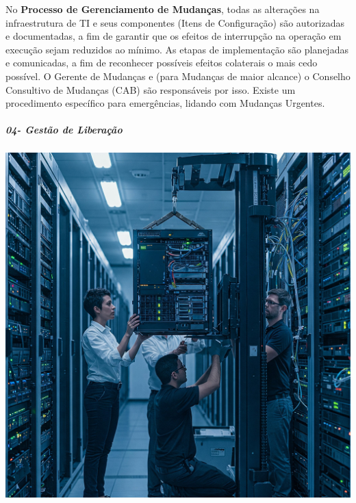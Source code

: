 \documentclass[
]{book}
\begin{document}
No \textbf{Processo de Gerenciamento de Mudanças}, todas as alterações na infraestrutura de TI e seus componentes (Itens de Configuração) são autorizadas e documentadas, a fim de garantir que os efeitos de interrupção na operação em execução sejam reduzidos ao mínimo. As etapas de implementação são planejadas e comunicadas, a fim de reconhecer possíveis efeitos colaterais o mais cedo possível. O Gerente de Mudanças e (para Mudanças de maior alcance) o Conselho Consultivo de Mudanças (CAB) são responsáveis por isso. Existe um procedimento específico para emergências, lidando com Mudanças Urgentes.

\subparagraph{04- Gestão de Liberação}\label{gestuxe3o-de-liberauxe7uxe3o}

\includegraphics{images/InfraEstrutura/ITIL/04-gerencia_de_liberação-02.jpg}
\end{document}

